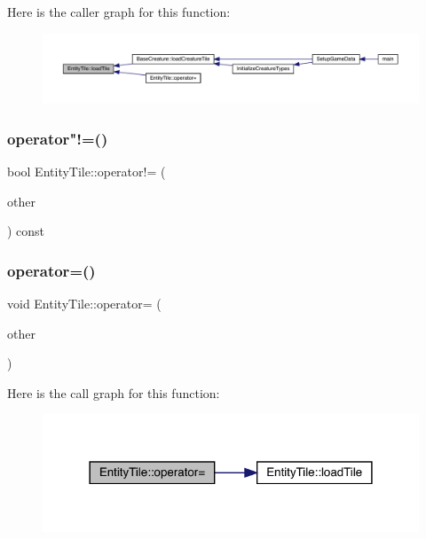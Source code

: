 Here is the caller graph for this function\+:
\nopagebreak
\begin{figure}[H]
\begin{center}
\leavevmode
\includegraphics[width=350pt]{class_entity_tile_a1a6b6b995ad942e7850f14cc6e693bbc_icgraph}
\end{center}
\end{figure}
\mbox{\label{class_entity_tile_ad5adfda10fac26073effad1f16d6ffb6}} 
\subsubsection{\texorpdfstring{operator"!=()}{operator!=()}}
{\footnotesize\ttfamily bool Entity\+Tile\+::operator!= (\begin{DoxyParamCaption}\item[{const \mbox{\hyperlink{class_entity_tile}{Entity\+Tile}} \&}]{other }\end{DoxyParamCaption}) const}

\mbox{\label{class_entity_tile_a81dbf6b294b80d6edcc830a243cdfae8}} 
\subsubsection{\texorpdfstring{operator=()}{operator=()}}
{\footnotesize\ttfamily void Entity\+Tile\+::operator= (\begin{DoxyParamCaption}\item[{const \mbox{\hyperlink{class_entity_tile}{Entity\+Tile}} \&}]{other }\end{DoxyParamCaption})}

Here is the call graph for this function\+:
\nopagebreak
\begin{figure}[H]
\begin{center}
\leavevmode
\includegraphics[width=318pt]{class_entity_tile_a81dbf6b294b80d6edcc830a243cdfae8_cgraph}
\end{center}
\end{figure}
\mbox{\label{class_entity_tile_a2b8c81d35530991c08ca2b6a76e436bf}} 
